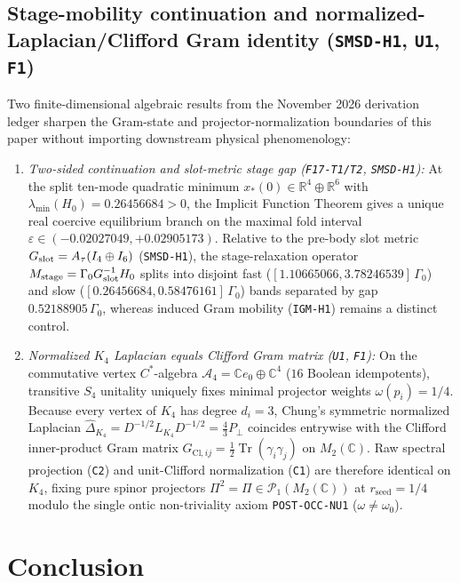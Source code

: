 \documentclass[11pt]{article}
\newcommand{\Tr}{\operatorname{Tr}}
\begin{document}
\subsection{Stage-mobility continuation and normalized-Laplacian/Clifford Gram identity (\texttt{SMSD-H1}, \texttt{U1}, \texttt{F1})}
\label{sec:paperii-algebraic-closure-20261114}
Two finite-dimensional algebraic results from the November 2026 derivation ledger sharpen the Gram-state and projector-normalization boundaries of this paper without importing downstream physical phenomenology:
\begin{enumerate}[label=(\roman*)]
\item \emph{Two-sided continuation and slot-metric stage gap (\texttt{F17-T1/T2}, \texttt{SMSD-H1}):} At the split ten-mode quadratic minimum $x_*(0)\in\mathbb{R}^4\oplus\mathbb{R}^6$ with $\lambda_{\min}(H_0)=0.26456684>0$, the Implicit Function Theorem gives a unique real coercive equilibrium branch on the maximal fold interval $\varepsilon\in(-0.02027049,+0.02905173)$. Relative to the pre-body slot metric $G_{\rm slot}=A_\tau(I_4\oplus I_6)$ (\texttt{SMSD-H1}), the stage-relaxation operator $M_{\rm stage}=\Gamma_0 G_{\rm slot}^{-1}H_0$ splits into disjoint fast ($[1.10665066,3.78246539]\,\Gamma_0$) and slow ($[0.26456684,0.58476161]\,\Gamma_0$) bands separated by gap $0.52188905\,\Gamma_0$, whereas induced Gram mobility (\texttt{IGM-H1}) remains a distinct control.
\item \emph{Normalized $K_4$ Laplacian equals Clifford Gram matrix (\texttt{U1}, \texttt{F1}):} On the commutative vertex $C^*$-algebra $\mathcal{A}_4=\mathbb{C}e_0\oplus\mathbb{C}^4$ ($16$ Boolean idempotents), transitive $S_4$ unitality uniquely fixes minimal projector weights $\omega(p_i)=1/4$. Because every vertex of $K_4$ has degree $d_i=3$, Chung's symmetric normalized Laplacian $\widehat{\Delta}_{K_4}=D^{-1/2}L_{K_4}D^{-1/2}=\frac{4}{3}P_\perp$ coincides entrywise with the Clifford inner-product Gram matrix $G_{\mathrm{Cl},ij}=\frac{1}{2}\Tr(\gamma_i\gamma_j)$ on $M_2(\mathbb{C})$. Raw spectral projection (\texttt{C2}) and unit-Clifford normalization (\texttt{C1}) are therefore identical on $K_4$, fixing pure spinor projectors $\Pi^2=\Pi\in\mathcal{P}_1(M_2(\mathbb{C}))$ at $r_{\mathrm{seed}}=1/4$ modulo the single ontic non-triviality axiom \texttt{POST-OCC-NU1} ($\omega\neq\omega_0$).
\end{enumerate}

\section{Conclusion}
\end{document}
